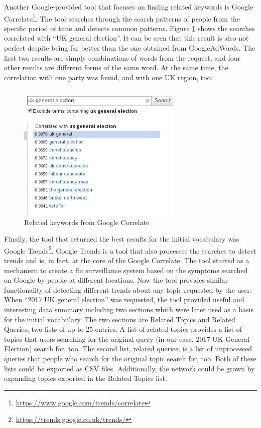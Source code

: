 Another Google-provided tool that focuses on finding related keywords is Google Correlate\footnote{\url{https://www.google.com/trends/correlate}}. The tool searches through the search patterns of people from the specific period of time and detects common patterns. Figure \ref{fig:googlecorrelation} shows the searches correlated with ``UK general election''. It can be seen that this result is also not perfect despite being far better than the one obtained from GoogleAdWords. The first two results are simply combinations of words from the request, and four other results are different forms of the same word. At the same time, the correlation with one party was found, and with one UK region, too.

\begin{figure}[ht]
\includegraphics[width=0.7\textwidth]{googlecorrelation}
\caption{Related keywords from Google Correlate}
\label{fig:googlecorrelation}
\end{figure}

Finally, the tool that returned the best results for the initial vocabulary was Google Trends\footnote{\url{https://trends.google.co.uk/trends/}}. Google Trends is a tool that also processes the searches to detect trends and is, in fact, at the core of the Google Correlate. The tool started as a mechanism to create a flu surveillance system based on the symptoms searched on Google by people at different locations. Now the tool provides similar functionality of detecting different trends about any topic requested by the user. When ``2017 UK general election'' was requested, the tool provided useful and interesting data summary including two sections which were later used as a basis for the initial vocabulary. The two sections are Related Topics and Related Queries, two lists of up to 25 entries. A list of related topics provides a list of topics that users searching for the original query (in our case, 2017 UK General Election) search for, too. The second list, related queries, is a list of unprocessed queries that people who search for the original topic search for, too. Both of these lists could be exported as CSV files. Additionally, the network could be grown by expanding topics exported in the Related Topics list.

